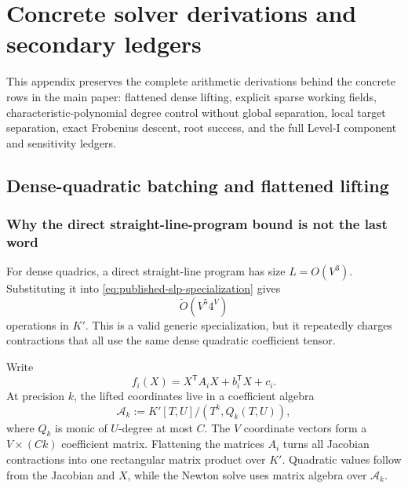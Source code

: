 \documentclass[11pt,a4paper]{article}
\theoremstyle{definition}
\theoremstyle{remark}
\newcommand{\softO}{\widetilde O}
\begin{document}
\section{Concrete solver derivations and secondary ledgers}\label{app:concrete-derivations}

This appendix preserves the complete arithmetic derivations behind the concrete
rows in the main paper: flattened dense lifting, explicit sparse working
fields, characteristic-polynomial degree control without global separation,
local target separation, exact Frobenius descent, root success, and the full
Level-I component and sensitivity ledgers.

\subsection{Dense-quadratic batching and flattened lifting}\label{supp:sec:flat-lifting}

\subsubsection{Why the direct straight-line-program bound is not the last word}
For dense quadrics, a direct straight-line program has size $L=O(V^3)$.  Substituting it into \eqref{eq:published-slp-specialization} gives
\begin{equation}\label{supp:eq:slp-asymptotic}
 \softO(V^5 4^V)
\end{equation}
operations in $K'$.  This is a valid generic specialization, but it repeatedly charges contractions that all use the same dense quadratic coefficient tensor.

Write
\begin{equation}\label{supp:eq:dense-quad-form}
 f_i(X)=X^{\mathsf T}A_iX+b_i^{\mathsf T}X+c_i.
\end{equation}
At precision $k$, the lifted coordinates live in a coefficient algebra
\begin{equation}\label{supp:eq:coefficient-algebra}
 \mathcal A_k
 :=K'[T,U]/(T^k,Q_k(T,U)),
\end{equation}
where $Q_k$ is monic of $U$-degree at most $C$.  The $V$ coordinate vectors form a $V\times(Ck)$ coefficient matrix.  Flattening the matrices $A_i$ turns all Jacobian contractions into one rectangular matrix product over $K'$.  Quadratic values follow from the Jacobian and $X$, while the Newton solve uses matrix algebra over $\mathcal A_k$.
\end{document}
